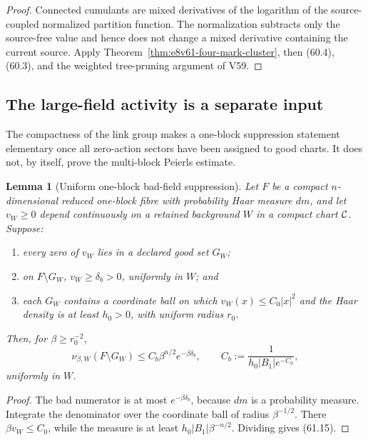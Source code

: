 \documentclass[11pt,oneside]{book}
\newtheorem{lemma}[theorem]{Lemma}
\theoremstyle{definition}
\theoremstyle{remark}
\begin{document}
\begin{proof}
Connected cumulants are mixed derivatives of the logarithm of the
source-coupled normalized partition function.  The normalization
subtracts only the source-free value and hence does not change a
mixed derivative containing the current source.  Apply
Theorem~\ref{thm:e8v61-four-mark-cluster}, then (60.4), (60.3), and
the weighted tree-pruning argument of V59.
\end{proof}

\subsection{The large-field activity is a separate input}

The compactness of the link group makes a one-block suppression
statement elementary once all zero-action sectors have been assigned
to good charts.  It does not, by itself, prove the multi-block
Peierls estimate.

\begin{lemma}[Uniform one-block bad-field suppression]
\label{lem:e8v61-one-block-bad}
Let \(F\) be a compact \(n\)-dimensional reduced one-block fibre
with probability Haar measure \(dm\), and let \(v_W\ge0\) depend
continuously on a retained background \(W\) in a compact chart
\({\cal C}\).  Suppose:
\begin{enumerate}
\item every zero of \(v_W\) lies in a declared good set \(G_W\);
\item on \(F\setminus G_W\),
      \(v_W\ge\delta_b>0\), uniformly in \(W\); and
\item each \(G_W\) contains a coordinate ball on which
      \(v_W(x)\le C_0|x|^2\) and the Haar density is at least
      \(h_0>0\), with uniform radius \(r_0\).
\end{enumerate}
Then, for \(\beta\ge r_0^{-2}\),
\[
 \nu_{\beta,W}(F\setminus G_W)
 \le C_b\beta^{n/2}e^{-\beta\delta_b},\qquad
 C_b:=\frac1{h_0|B_1|e^{-C_0}},                              \tag{61.15}
\]
uniformly in \(W\).
\end{lemma}

\begin{proof}
The bad numerator is at most \(e^{-\beta\delta_b}\), because
\(dm\) is a probability measure.  Integrate the denominator over
the coordinate ball of radius \(\beta^{-1/2}\).  There
\(\beta v_W\le C_0\), while the measure is at least
\(h_0|B_1|\beta^{-n/2}\).  Dividing gives (61.15).
\end{proof}
\end{document}
